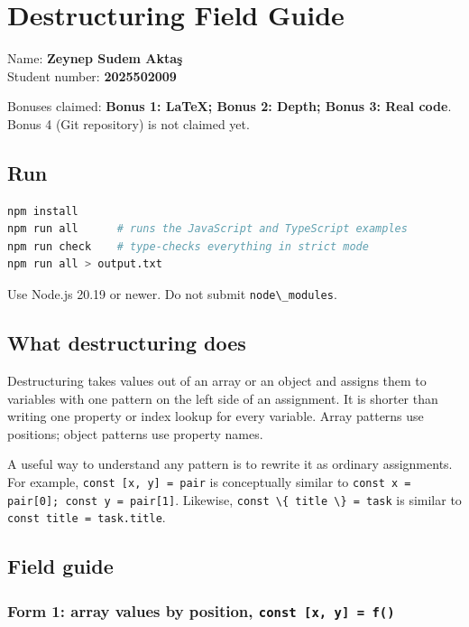 \documentclass[
]{article}
\author{}
\date{}
\newcommand{\passthrough}[1]{#1}
\begin{document}
{
\setcounter{tocdepth}{3}
\tableofcontents
}
\section{Destructuring Field Guide}\label{destructuring-field-guide}

Name: \textbf{Zeynep Sudem Aktaş}\\
Student number: \textbf{2025502009}

Bonuses claimed: \textbf{Bonus 1: LaTeX; Bonus 2: Depth; Bonus 3: Real
code}. Bonus 4 (Git repository) is not claimed yet.

\subsection{Run}\label{run}

\begin{lstlisting}[language=bash]
npm install
npm run all      # runs the JavaScript and TypeScript examples
npm run check    # type-checks everything in strict mode
npm run all > output.txt
\end{lstlisting}

Use Node.js 20.19 or newer. Do not submit
\passthrough{\lstinline!node\_modules!}.

\subsection{What destructuring does}\label{what-destructuring-does}

Destructuring takes values out of an array or an object and assigns them
to variables with one pattern on the left side of an assignment. It is
shorter than writing one property or index lookup for every variable.
Array patterns use positions; object patterns use property names.

A useful way to understand any pattern is to rewrite it as ordinary
assignments. For example, \passthrough{\lstinline!const [x, y] = pair!}
is conceptually similar to
\passthrough{\lstinline!const x = pair[0]; const y = pair[1]!}.
Likewise, \passthrough{\lstinline!const \{ title \} = task!} is similar
to \passthrough{\lstinline!const title = task.title!}.

\subsection{Field guide}\label{field-guide}

\subsubsection{\texorpdfstring{Form 1: array values by position,
\texttt{const\ {[}x,\ y{]}\ =\ f()}}{Form 1: array values by position, const {[}x, y{]} = f()}}\label{form-1-array-values-by-position-const-x-y--f}
\end{document}
